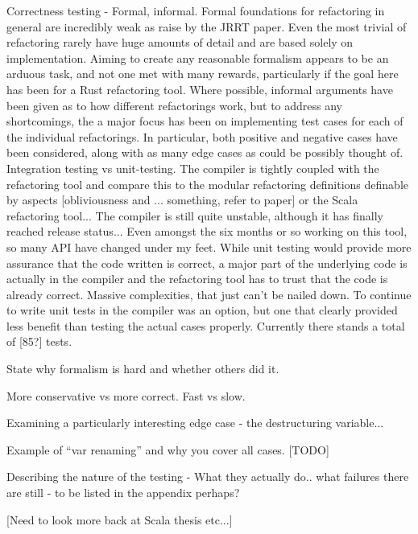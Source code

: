 Correctness testing - Formal, informal. Formal foundations for refactoring in general are incredibly weak as raise by the JRRT paper. Even the most trivial of refactoring rarely have huge amounts of detail and are based solely on implementation. Aiming to create any reasonable formalism appears to be an arduous task, and not one met with many rewards, particularly if the goal here has been for a Rust refactoring tool. Where possible, informal arguments have been given as to how different refactorings work, but to address any shortcomings, the a major focus has been on implementing test cases for each of the individual refactorings. In particular, both positive and negative cases have been considered, along with as many edge cases as could be possibly thought of. Integration testing vs unit-testing. The compiler is tightly coupled with the refactoring tool and compare this to the modular refactoring definitions definable by aspects [obliviousness and ... something, refer to paper] or the Scala refactoring tool... The compiler is still quite unstable, although it has finally reached release status... Even amongst the six months or so working on this tool, so many API have changed under my feet. While unit testing would provide more assurance that the code written is correct, a major part of the underlying code is actually in the compiler and the refactoring tool has to trust that the code is already correct. Massive complexities, that just can't be nailed down. To continue to write unit tests in the compiler was an option, but one that clearly provided less benefit than testing the actual cases properly. Currently there stands a total of [85?] tests.

State why formalism is hard and whether others did it.

More conservative vs more correct. Fast vs slow.

Examining a particularly interesting edge case - the destructuring variable...

Example of “var renaming” and why you cover all cases.
[TODO]

Describing the nature of the testing - What they actually do.. what failures there are still - to be listed in the appendix perhaps?

[Need to look more back at Scala thesis etc...]
